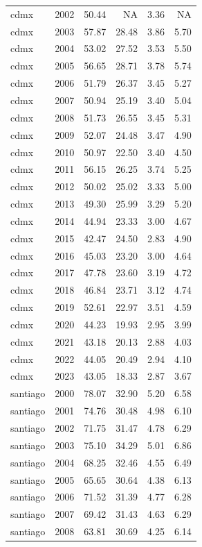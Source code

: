 \begin{table}[!htbp]
\begin{tabular}{ll
rrrr
}
cdmx & 2002 & 50.44 &  NA & 3.36 &  NA \\
cdmx & 2003 & 57.87 & 28.48 & 3.86 & 5.70 \\
cdmx & 2004 & 53.02 & 27.52 & 3.53 & 5.50 \\
cdmx & 2005 & 56.65 & 28.71 & 3.78 & 5.74 \\
cdmx & 2006 & 51.79 & 26.37 & 3.45 & 5.27 \\
cdmx & 2007 & 50.94 & 25.19 & 3.40 & 5.04 \\
cdmx & 2008 & 51.73 & 26.55 & 3.45 & 5.31 \\
cdmx & 2009 & 52.07 & 24.48 & 3.47 & 4.90 \\
cdmx & 2010 & 50.97 & 22.50 & 3.40 & 4.50 \\
cdmx & 2011 & 56.15 & 26.25 & 3.74 & 5.25 \\
cdmx & 2012 & 50.02 & 25.02 & 3.33 & 5.00 \\
cdmx & 2013 & 49.30 & 25.99 & 3.29 & 5.20 \\
cdmx & 2014 & 44.94 & 23.33 & 3.00 & 4.67 \\
cdmx & 2015 & 42.47 & 24.50 & 2.83 & 4.90 \\
cdmx & 2016 & 45.03 & 23.20 & 3.00 & 4.64 \\
cdmx & 2017 & 47.78 & 23.60 & 3.19 & 4.72 \\
cdmx & 2018 & 46.84 & 23.71 & 3.12 & 4.74 \\
cdmx & 2019 & 52.61 & 22.97 & 3.51 & 4.59 \\
cdmx & 2020 & 44.23 & 19.93 & 2.95 & 3.99 \\
cdmx & 2021 & 43.18 & 20.13 & 2.88 & 4.03 \\
cdmx & 2022 & 44.05 & 20.49 & 2.94 & 4.10 \\
cdmx & 2023 & 43.05 & 18.33 & 2.87 & 3.67 \\
santiago & 2000 & 78.07 & 32.90 & 5.20 & 6.58 \\
santiago & 2001 & 74.76 & 30.48 & 4.98 & 6.10 \\
santiago & 2002 & 71.75 & 31.47 & 4.78 & 6.29 \\
santiago & 2003 & 75.10 & 34.29 & 5.01 & 6.86 \\
santiago & 2004 & 68.25 & 32.46 & 4.55 & 6.49 \\
santiago & 2005 & 65.65 & 30.64 & 4.38 & 6.13 \\
santiago & 2006 & 71.52 & 31.39 & 4.77 & 6.28 \\
santiago & 2007 & 69.42 & 31.43 & 4.63 & 6.29 \\
santiago & 2008 & 63.81 & 30.69 & 4.25 & 6.14 \\

\end{tabular}
\end{table}
